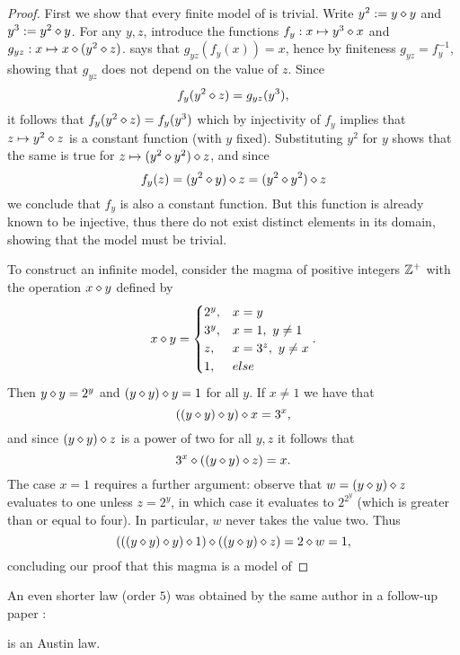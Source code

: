 \begin{proof} \leanok  First we show that every finite model of  is trivial.  Write $y^2 := y \diamond y$ and $y^3 := y^2 \diamond y$.  For any $y,z$, introduce the functions ${f_y: x \mapsto y^3 \diamond x}$ and ${g_{yz}: x \mapsto x \diamond (y^2 \diamond z)}$.   says that $g_{yz}(f_y(x))=x$, hence by finiteness $g_{yz}=f_y^{-1}$, showing that $g_{yz}$ does not depend on the value of $z$.  Since
$$ f_y(y^2 \diamond z) = g_{yz}(y^3),$$
it follows that $f_y(y^2 \diamond z)=f_y(y^3)$ which by injectivity of $f_y$ implies that $z\mapsto y^2 \diamond z$ is a constant function (with $y$ fixed).  Substituting $y^2$ for $y$ shows that the same is true for $z\mapsto (y^2 \diamond y^2) \diamond z$, and since
$$ f_y(z) = (y^2 \diamond y) \diamond z = (y^2 \diamond y^2) \diamond z$$
we conclude that $f_y$ is also a constant function.  But this function is already known to be injective, thus there do not exist distinct elements in its domain, showing that the model must be trivial.

To construct an infinite model, consider the magma of positive integers $\mathbb{Z}^+$ with the operation $x \diamond y$ defined by
$$
x \diamond y =
\begin{cases}
2^y, & x=  y            \\
3^y, & x=  1,\ y \neq 1 \\
  z, & x=3^z,\ y \neq x \\
  1, & else
\end{cases}.
$$
Then $y \diamond y = 2^y$ and $(y \diamond y) \diamond y = 1$ for all $y$.  If $x\neq 1$ we have that
$$ ((y \diamond y) \diamond y) \diamond x = 3^x, $$
and since $(y \diamond y) \diamond z$ is a power of two for all $y, z$ it follows that
$$ 3^x \diamond ((y \diamond y) \diamond z) = x. $$
The case $x=1$ requires a further argument: observe that $w = (y \diamond y) \diamond z$ evaluates to one unless $z = 2^y$, in which case it evaluates to $2^{2^y}$ (which is greater than or equal to four).  In particular, $w$ never takes the value two.  Thus
$$ (((y \diamond y) \diamond y) \diamond 1) \diamond ((y \diamond y) \diamond z) = 2 \diamond w = 1, $$
concluding our proof that this magma is a model of 
\end{proof}

An even shorter law (order $5$) was obtained by the same author in a follow-up paper \cite{Kisielewicz2}:

\begin{theorem}\label{kis-thm2}  is an Austin law.
\end{theorem}

